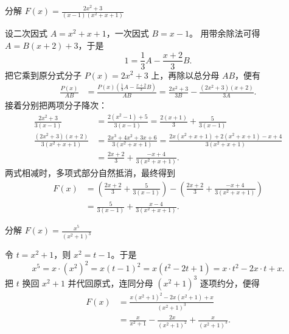 \begin{example}[分解 $\frac{2x^2 + 3}{(x-1)(x^2+x+1)}$]
    分解 $\displaystyle F(x) = \frac{2x^2 + 3}{(x-1)(x^2+x+1)}$
\end{example}
\begin{solution}
设二次因式 $A = x^2+x+1$，一次因式 $B = x-1$。
用带余除法可得 $A = B(x+2) + 3$，于是
$$ 1 = \frac{1}{3}A - \frac{x+2}{3}B. $$
把它乘到原分式分子 $P(x)=2x^2+3$ 上，再除以总分母 $AB$，便有
\begin{align*}
\frac{P(x)}{AB} &= \frac{P(x) \left(\frac{1}{3}A - \frac{x+2}{3}B\right)}{AB} = \frac{2x^2+3}{3B} - \frac{(2x^2+3)(x+2)}{3A}.
\end{align*}
接着分别把两项分子降次：
\begin{align*}
\frac{2x^2+3}{3(x-1)} &= \frac{2(x^2-1)+5}{3(x-1)} = \frac{2(x+1)}{3} + \frac{5}{3(x-1)} \\
\frac{(2x^2+3)(x+2)}{3(x^2+x+1)} &= \frac{2x^3+4x^2+3x+6}{3(x^2+x+1)} = \frac{2x(x^2+x+1) + 2(x^2+x+1) - x + 4}{3(x^2+x+1)} \\
&= \frac{2x+2}{3} + \frac{-x+4}{3(x^2+x+1)}.
\end{align*}
两式相减时，多项式部分自然抵消，最终得到
\begin{align*}
F(x) &= \left(\frac{2x+2}{3} + \frac{5}{3(x-1)}\right) - \left(\frac{2x+2}{3} + \frac{-x+4}{3(x^2+x+1)}\right) \\
&= \frac{5}{3(x-1)} + \frac{x-4}{3(x^2+x+1)}.
\end{align*}
\end{solution}

\begin{example}[分解 $\frac{x^5}{(x^2+1)^3}$]
    分解 $\displaystyle F(x) = \frac{x^5}{(x^2+1)^3}$
\end{example}
\begin{solution}
令 $t = x^2+1$，则 $x^2 = t-1$。于是
$$ x^5 = x \cdot (x^2)^2 = x(t-1)^2 = x(t^2 - 2t + 1) = x \cdot t^2 - 2x \cdot t + x. $$
把 $t$ 换回 $x^2+1$ 并代回原式，连同分母 $(x^2+1)^3$ 逐项约分，便得
\begin{align*}
F(x) &= \frac{x(x^2+1)^2 - 2x(x^2+1) + x}{(x^2+1)^3} \\
&= \frac{x}{x^2+1} - \frac{2x}{(x^2+1)^2} + \frac{x}{(x^2+1)^3}.
\end{align*}
\end{solution}

